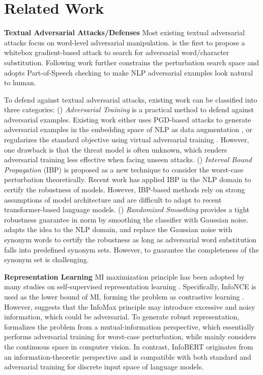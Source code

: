 \documentclass{article} \usepackage{iclr2021_conference,times}
\theoremstyle{definition}
\theoremstyle{remark}
\newcommand{\method}{InfoBERT\xspace}
\begin{document}
\section{Related Work}
\vspace{-1mm}


\textbf{Textual Adversarial Attacks/Defenses} Most existing textual adversarial attacks focus on word-level adversarial manipulation. \citet{hotflip} is the first to propose a whitebox gradient-based attack to search for adversarial word/character substitution. Following work \citep{DBLP:conf/emnlp/AlzantotSEHSC18, weight_attack, comattack, textfooler} further constrains the perturbation search space and adopts Part-of-Speech checking to make NLP adversarial examples look natural to human. 

To defend against textual adversarial attacks, existing work can be classified into three categories:
() \textit{Adversarial Training} is a practical method to defend against adversarial examples. Existing work either uses PGD-based attacks to generate adversarial examples in the embedding space of NLP as data augmentation \citep{freelb}, or regularizes the standard objective using virtual adversarial training \citep{smart,alum,gan2020large}. However, one drawback is that the threat model is often unknown, which renders adversarial training less effective when facing unseen attacks.
() \textit{Interval Bound Propagation} (IBP) \citep{ibp} is proposed as a new technique to consider the worst-case perturbation theoretically. Recent work \citep{ibp1,ibp2} has applied IBP in the NLP domain to certify the robustness of models. However, IBP-based methods rely on strong assumptions of model architecture and are difficult to adapt to recent transformer-based language models. 
() \textit{Randomized Smoothing} \citep{DBLP:conf/icml/CohenRK19} provides a tight robustness guarantee in  norm by smoothing the classifier with Gaussian noise. \citet{safer} adapts the idea to the NLP domain, and replace the Gaussian noise with synonym words to certify the robustness as long as adversarial word substitution falls into predefined synonym sets. However, to guarantee the completeness of the synonym set is challenging.

\textbf{Representation Learning} MI maximization principle has been adopted by many studies on self-supervised representation learning \citep{infonce,pmlr-v80-belghazi18a,hjelm2018learning,simclr}. Specifically, InfoNCE \citep{infonce} is used as the lower bound of MI, forming the problem as contrastive learning \citep{DBLP:conf/icml/SaunshiPAKK19, yu2020finetuning}. However, \citet{infomin} suggests that the InfoMax \citep{DBLP:journals/computer/Linsker88} principle may introduce excessive and noisy information, which could be adversarial. 
To generate robust representation, \citet{worstcase} formalizes the problem from a mutual-information perspective, which essentially performs adversarial training for worst-case perturbation, while mainly considers the continuous space in computer vision. In contrast, \method originates from an information-theoretic perspective and is compatible with both standard and adversarial training for discrete input space of language models.
\end{document}
